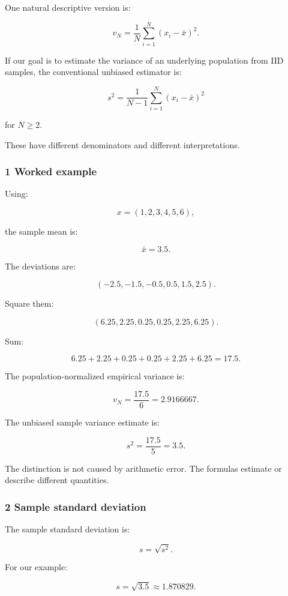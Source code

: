 One natural descriptive version is:

\[
 \boxed{ v_N= \frac1N \sum_{i=1}^{N}(x_i-\bar x)^2 }.
\]

If our goal is to estimate the variance of an underlying population from IID samples, the conventional unbiased estimator is:

\[
 \boxed{ s^2= \frac1{N-1} \sum_{i=1}^{N}(x_i-\bar x)^2 }
\]

for \(N\ge2\).

These have different denominators and different interpretations.

\subsubsection{1 Worked example}\label{02-foundations-ii-ch030-worked-example}

Using:

\[
 x=(1,2,3,4,5,6),
\]

the sample mean is:

\[
 \bar x=3.5.
\]

The deviations are:

\[
 (-2.5,-1.5,-0.5,0.5,1.5,2.5).
\]

Square them:

\[
 (6.25,2.25,0.25,0.25,2.25,6.25).
\]

Sum:

\[
 6.25+2.25+0.25+0.25+2.25+6.25 =\boxed{17.5}.
\]

The population-normalized empirical variance is:

\[
 v_N=\frac{17.5}{6} =\boxed{2.9166667}.
\]

The unbiased sample variance estimate is:

\[
 s^2=\frac{17.5}{5} =\boxed{3.5}.
\]

The distinction is not caused by arithmetic error. The formulas estimate or describe different quantities.

\subsubsection{2 Sample standard deviation}\label{02-foundations-ii-ch030-sample-standard-deviation}

The sample standard deviation is:

\[
 \boxed{s=\sqrt{s^2}}.
\]

For our example:

\[
 s=\sqrt{3.5}\approx1.870829.
\]


